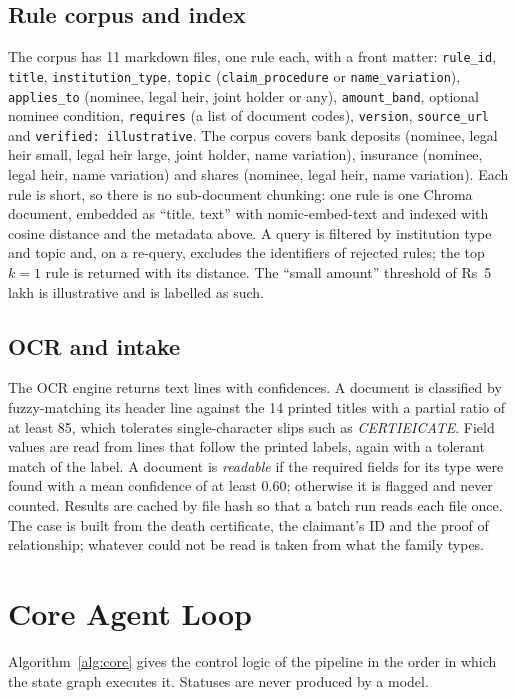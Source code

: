 \subsection{Rule corpus and index}
The corpus has 11 markdown files, one rule each, with a front matter: \texttt{rule\_id}, \texttt{title}, \texttt{institution\_type}, \texttt{topic} (\texttt{claim\_procedure} or \texttt{name\_variation}), \texttt{applies\_to} (nominee, legal heir, joint holder or any), \texttt{amount\_band}, optional nominee condition, \texttt{requires} (a list of document codes), \texttt{version}, \texttt{source\_url} and \texttt{verified: illustrative}. The corpus covers bank deposits (nominee, legal heir small, legal heir large, joint holder, name variation), insurance (nominee, legal heir, name variation) and shares (nominee, legal heir, name variation). Each rule is short, so there is no sub-document chunking: one rule is one Chroma document, embedded as ``title. text'' with nomic-embed-text and indexed with cosine distance and the metadata above. A query is filtered by institution type and topic and, on a re-query, excludes the identifiers of rejected rules; the top $k=1$ rule is returned with its distance. The ``small amount'' threshold of Rs~5 lakh is illustrative and is labelled as such.

\subsection{OCR and intake}
The OCR engine returns text lines with confidences. A document is classified by fuzzy-matching its header line against the 14 printed titles with a partial ratio of at least 85, which tolerates single-character slips such as \emph{CERTIEICATE}. Field values are read from lines that follow the printed labels, again with a tolerant match of the label. A document is \emph{readable} if the required fields for its type were found with a mean confidence of at least 0.60; otherwise it is flagged and never counted. Results are cached by file hash so that a batch run reads each file once. The case is built from the death certificate, the claimant's ID and the proof of relationship; whatever could not be read is taken from what the family types.

\section{Core Agent Loop}
Algorithm~\ref{alg:core} gives the control logic of the pipeline in the order in which the state graph executes it. Statuses are never produced by a model.

